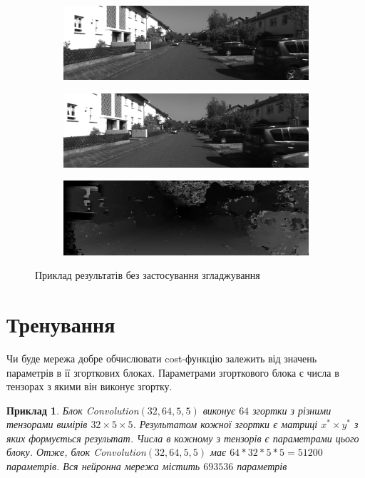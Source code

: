\documentclass{article}
\newtheorem*{example*}{Приклад}
\theoremstyle{definition}
\begin{document}
 \begin{figure}[h]
 	\begin{subfigure}{\textwidth}
 		\includegraphics[width=\linewidth]{kitti_example_left}
 		\centering
 	\end{subfigure}
 	\begin{subfigure}{\textwidth}
 		\includegraphics[width=\linewidth]{kitti_example_right}
 		\centering
 	\end{subfigure}
	\begin{subfigure}{\textwidth}
		\includegraphics[width=\linewidth]{no_smoothing_result}
		\centering
	\end{subfigure}
 	\centering
 	\caption{Приклад результатів без застосування згладжування}
 	\label{fig:bad_approach_example}
 \end{figure}

\section{Тренування}
Чи буде мережа добре обчислювати cost-функцію залежить від значень параметрів в її згорткових блоках. Параметрами згорткового блока є числа в тензорах з якими він виконує згортку.
\begin{example*}
	Блок \textit{Convolution}$(32, 64, 5, 5)$ виконує $64$ згортки з різними тензорами вимірів $32 \times 5 \times 5$. Результатом кожної згортки є матриці $x^* \times y^*$ з яких формується результат. Числа в кожному з тензорів є параметрами цього блоку. Отже, блок \textit{Convolution}$(32, 64, 5, 5)$ має $64 * 32 * 5 * 5 = 51200$ параметрів. Вся нейронна мережа містить $693536$ параметрів
\end{example*} 
\end{document}
